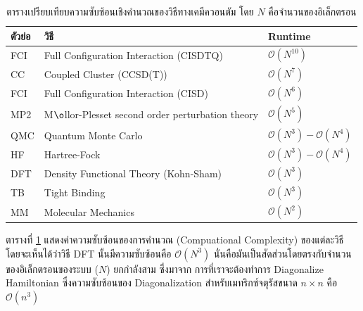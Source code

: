 \begin{table}[H]
    \centering
    \caption{ตารางเปรียบเทียบความซับซ้อนเชิงคำนวณของวิธีทางเคมีควอนตัม\autocite{rupp2015} โดย $N$ คือจำนวนของอิเล็กตรอน}
    \label{tab:qm_complx}
    \small
    \begin{tabular}{lll}\toprule
    ตัวย่อ &วิธี &Runtime \\\midrule
    FCI &Full Configuration Interaction (CISDTQ) &$\mathcal{O}(N^{10})$ \\
    CC &Coupled Cluster (CCSD(T)) &$\mathcal{O}(N^{7})$ \\
    FCI &Full Configuration Interaction (CISD) &$\mathcal{O}(N^{6})$ \\
    MP2 &M$\o$llor-Plesset second order perturbation theory &$\mathcal{O}(N^{5})$ \\
    QMC &Quantum Monte Carlo &$\mathcal{O}(N^{3}) - \mathcal{O}(N^{4})$ \\
    HF &Hartree-Fock &$\mathcal{O}(N^{3}) - \mathcal{O}(N^{4})$ \\
    DFT &Density Functional Theory (Kohn-Sham) &$\mathcal{O}(N^{3})$ \\
    TB &Tight Binding &$\mathcal{O}(N^{3})$ \\
    MM &Molecular Mechanics &$\mathcal{O}(N^{2})$ \\
    \bottomrule
    \end{tabular}
\end{table}

ตารางที่ \ref{tab:qm_complx} แสดงค่าความซับซ้อนของการคำนวณ (Compuational Complexity) ของแต่ละวิธี โดยจะเห็นได้ว่าวิธี DFT 
นั้นมีความซับซ้อนคือ $\mathcal{O}(N^{3})$ นั่นคือมันเป็นสัดส่วนโดยตรงกับจำนวนของอิเล็กตรอนของระบบ ($N$) ยกกำลังสาม ซึ่งมาจาก%
การที่เราจะต้องทำการ Diagonalize Hamiltonian ซึ่งความซับซ้อนของ Diagonalization สำหรับเมทริกซ์จตุรัสขนาด $n \times n$ คือ 
$\mathcal{O}(n^{3})$

